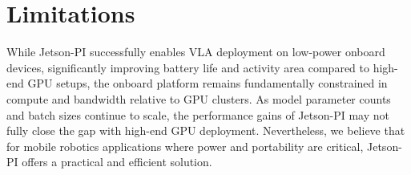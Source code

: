 \section{Limitations}
While Jetson-PI successfully enables VLA deployment on low-power onboard devices, significantly improving battery life and activity area compared to high-end GPU setups, the onboard platform remains fundamentally constrained in compute and bandwidth relative to GPU clusters. As model parameter counts and batch sizes continue to scale, the performance gains of Jetson-PI may not fully close the gap with high-end GPU deployment. Nevertheless, we believe that for mobile robotics applications where power and portability are critical, Jetson-PI offers a practical and efficient solution.


\begin{table}[t]
\centering
\caption{Model architecture parameters of $\pi$ series VLA models.}
\label{tab:pi_architecture}
\end{table}



